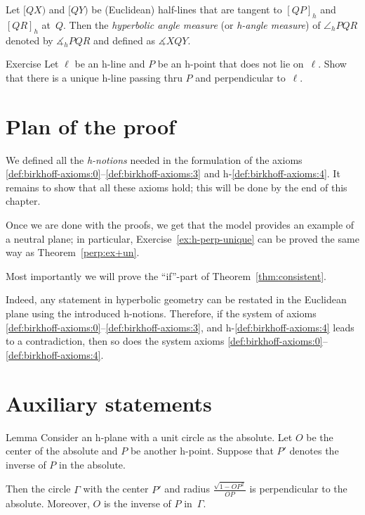 Let $[QX)$ and $[QY)$ be (Euclidean) half-lines 
that are tangent to $[QP]_h$ and $[QR]_h$ 
at~$Q$.
Then the \emph{hyperbolic angle measure} (or \emph{h-angle measure}) of $\angle_h PQR$ denoted by
$\measuredangle_h PQR$ and defined as
$\measuredangle XQY$.

\begin{thm}{Exercise}\label{ex:h-perp-unique}
Let $\ell$ be an h-line and $P$ be an h-point that does not lie on~$\ell$.
Show that there is a unique h-line passing thru $P$ 
and perpendicular to~$\ell$.
\end{thm}

\section*{Plan of the proof}

We defined all the {}\emph{h-notions} needed in the formulation of the axioms \ref{def:birkhoff-axioms:0}--\ref{def:birkhoff-axioms:3} and h-\ref{def:birkhoff-axioms:4}.
It remains to show that all these axioms hold; 
this will be done by the end of this chapter.

Once we are done with the proofs, 
we get that the model provides an example of a neutral plane; 
in particular, Exercise~\ref{ex:h-perp-unique} can be proved the same way as Theorem~\ref{perp:ex+un}.

Most importantly we will prove the ``if''-part of Theorem~\ref{thm:consistent}.

Indeed, any statement in hyperbolic geometry can be restated in the Euclidean plane using the introduced h-notions.
Therefore, if the system of axioms \ref{def:birkhoff-axioms:0}--\ref{def:birkhoff-axioms:3}, and h-\ref{def:birkhoff-axioms:4} leads to a contradiction, then so does the system axioms \ref{def:birkhoff-axioms:0}--\ref{def:birkhoff-axioms:4}.

\section*{Auxiliary statements}

\begin{thm}{Lemma}\label{lem:P-->O} 
Consider an h-plane with a unit circle as the absolute.
Let $O$ be the center of the absolute and $P$ be another h-point.
Suppose that $P'$ denotes the inverse of $P$ in the absolute.

Then the circle $\Gamma$ with the center $P'$ and radius 
$\tfrac{\sqrt{1-OP^2}}{OP}$
is perpendicular to the absolute.
Moreover, $O$ is the inverse of $P$ in~$\Gamma$. 
\end{thm}

